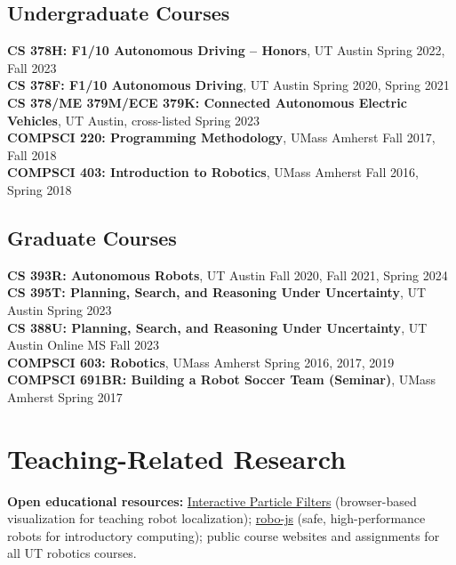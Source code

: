 \documentclass[Times]{article}
\newcommand{\course}[3]{\textbf{#1}, #2 \hfill {\small #3}\\}
\begin{document}
\subsection*{Undergraduate Courses}
\course{CS 378H: F1/10 Autonomous Driving -- Honors}{UT Austin}{Spring 2022, Fall 2023}
\course{CS 378F: F1/10 Autonomous Driving}{UT Austin}{Spring 2020, Spring 2021}
\course{CS 378/ME 379M/ECE 379K: Connected Autonomous Electric Vehicles}{UT Austin, cross-listed}{Spring 2023}
\course{COMPSCI 220: Programming Methodology}{UMass Amherst}{Fall 2017, Fall 2018}
\course{COMPSCI 403: Introduction to Robotics}{UMass Amherst}{Fall 2016, Spring 2018}

\subsection*{Graduate Courses}
\course{CS 393R: Autonomous Robots}{UT Austin}{Fall 2020, Fall 2021, Spring 2024}
\course{CS 395T: Planning, Search, and Reasoning Under Uncertainty}{UT Austin}{Spring 2023}
\course{CS 388U: Planning, Search, and Reasoning Under Uncertainty}{UT Austin Online MS}{Fall 2023}
\course{COMPSCI 603: Robotics}{UMass Amherst}{Spring 2016, 2017, 2019}
\course{COMPSCI 691BR: Building a Robot Soccer Team (Seminar)}{UMass Amherst}{Spring 2017}

\section*{Teaching-Related Research}
\vspace{-0.3em}
\begin{refsection}
\nocite{xu2026essentials}
\nocite{biswas2025essentials}
\nocite{betz2024f1tenth}
\nocite{vekhter2023responsible}
\nocite{spitzer2020jsbots}
\printbibliography[heading=none]
\end{refsection}
\vspace{-0.4em}
\textbf{Open educational resources:}
\href{https://amrl.cs.utexas.edu/interactive-particle-filters/}{Interactive Particle Filters} (browser-based
visualization for teaching robot localization);
\href{https://github.com/ut-amrl/robo-js}{robo-js} (safe, high-performance robots for introductory
computing); public course websites and assignments for all UT robotics courses.
\end{document}
